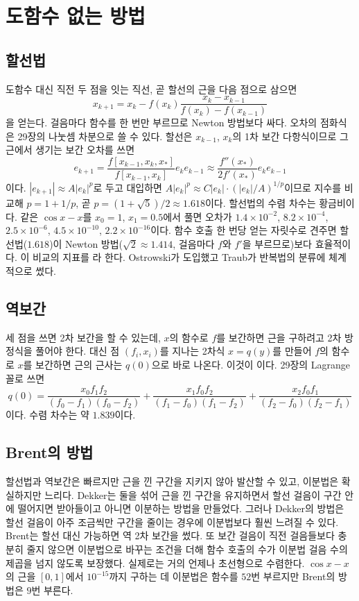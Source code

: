 \section{도함수 없는 방법}
\label{sec:derivative-free}

\subsection{할선법}

도함수 대신 직전 두 점을 잇는 직선, 곧 할선의 근을 다음 점으로 삼으면 
\[
x_{k+1}=x_k-f(x_k)\frac{x_k-x_{k-1}}{f(x_k)-f(x_{k-1})}
\]
을 얻는다. 걸음마다 함수를 한 번만 부르므로 Newton 방법보다 싸다. 오차의 점화식은 29장의 나눗셈 차분으로 쓸 수 있다. 할선은 $x_{k-1}$, $x_k$의 1차 보간 다항식이므로 그 근에서 생기는 보간 오차를 쓰면
\[
e_{k+1}=\frac{f[x_{k-1},x_k,x_\ast]}{f[x_{k-1},x_k]}e_ke_{k-1}\approx\frac{f''(x_\ast)}{2f'(x_\ast)}e_ke_{k-1}
\]
이다. $|e_{k+1}|\approx A|e_k|^p$로 두고 대입하면 $A|e_k|^p\approx C|e_k|\cdot(|e_k|/A)^{1/p}$이므로 지수를 비교해 $p=1+1/p$, 곧 $p=(1+\sqrt5)/2\approx1.618$이다. 할선법의 수렴 차수는 황금비이다. 같은 $\cos x-x$를 $x_0=1$, $x_1=0.5$에서 풀면 오차가 $1.4\times10^{-2}$, $8.2\times10^{-4}$, $2.5\times10^{-6}$, $4.5\times10^{-10}$, $2.2\times10^{-16}$이다. 함수 호출 한 번당 얻는 자릿수로 견주면 할선법($1.618$)이 Newton 방법($\sqrt2\approx1.414$, 걸음마다 $f$와 $f'$을 부르므로)보다 효율적이다. 이 비교의 지표를 라 한다. Ostrowski가 도입했고 Traub가 반복법의 분류에 체계적으로 썼다\cite{traub1964}.

\subsection{역보간}

세 점을 쓰면 2차 보간을 할 수 있는데, $x$의 함수로 $f$를 보간하면 근을 구하려고 2차 방정식을 풀어야 한다. 대신 점 $(f_i,x_i)$를 지나는 2차식 $x=q(y)$를 만들어 $f$의 함수로 $x$를 보간하면 근의 근사는 $q(0)$으로 바로 나온다. 이것이 이다. 29장의 Lagrange 꼴로 쓰면
\[
q(0)=\frac{x_0f_1f_2}{(f_0-f_1)(f_0-f_2)}+\frac{x_1f_0f_2}{(f_1-f_0)(f_1-f_2)}+\frac{x_2f_0f_1}{(f_2-f_0)(f_2-f_1)}
\]
이다. 수렴 차수는 약 $1.839$이다.

\subsection{Brent의 방법}

할선법과 역보간은 빠르지만 근을 낀 구간을 지키지 않아 발산할 수 있고, 이분법은 확실하지만 느리다. Dekker는 둘을 섞어 근을 낀 구간을 유지하면서 할선 걸음이 구간 안에 떨어지면 받아들이고 아니면 이분하는 방법을 만들었다\cite{dekker1969}. 그러나 Dekker의 방법은 할선 걸음이 아주 조금씩만 구간을 줄이는 경우에 이분법보다 훨씬 느려질 수 있다. Brent는 할선 대신 가능하면 역 2차 보간을 썼다. 또 보간 걸음이 직전 걸음들보다 충분히 줄지 않으면 이분법으로 바꾸는 조건을 더해 함수 호출의 수가 이분법 걸음 수의 제곱을 넘지 않도록 보장했다\cite{brent1973}. 실제로는 거의 언제나 초선형으로 수렴한다. $\cos x-x$의 근을 $[0,1]$에서 $10^{-15}$까지 구하는 데 이분법은 함수를 $52$번 부르지만 Brent의 방법은 $9$번 부른다.

